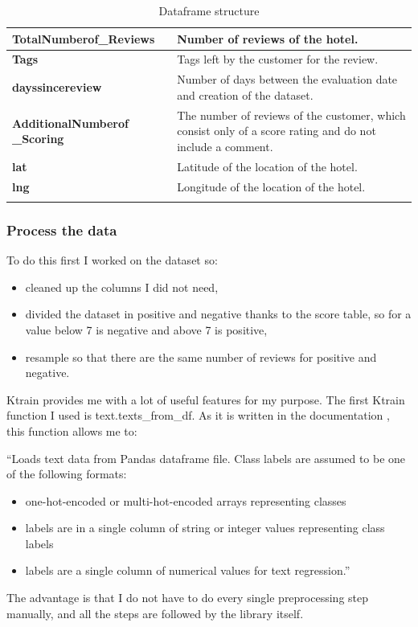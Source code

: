 \begin{longtable}[ c ]{| m{5cm} | m{8cm}|}
\textbf{TotalNumberof\_Reviews}               & Number of reviews of the hotel.                                                                   \\ \hline
\textbf{Tags}                                 & Tags left by the customer for the review.                                                 \\ \hline
\textbf{dayssincereview}                      & Number of days between the evaluation date and creation of the \gls{dataset}.                              \\ \hline
\textbf{AdditionalNumberof \_Scoring} & The number of reviews of the customer, which consist only of a score rating and do not include a comment. \\ \hline
\textbf{lat}                                  & Latitude of the location of the hotel.                                                                 \\ \hline
\textbf{lng}                                  & Longitude of the location of the hotel.                                                                  \\ \hline
\caption{Dataframe structure}
\label{tab:Dataframe structure}\\
\end{longtable}

\subsubsection{Process the data}
To do this first I worked on the dataset so:
\begin{itemize}
    \item cleaned up the columns I did not need,
    \item divided the dataset in positive and negative thanks to the score table, so for a value below 7 is negative and above 7 is positive,
    \item resample so that there are the same number of reviews for positive and negative.
\end{itemize}

\gls{Ktrain} provides me with a lot of useful features for my purpose.
The first \gls{Ktrain} function I used is text.texts\_from\_df.
As it is written in the documentation \cite{noauthor_amaiyaktrain_nodate}, this function allows me to:

“Loads text data from \gls{Pandas} dataframe file. Class labels are assumed to be one of the following formats:
\begin{itemize}
    \item one-hot-encoded or multi-hot-encoded arrays representing classes
    \item labels are in a single column of string or integer values representing class labels
    \item labels are a single column of numerical values for text regression.”
\end{itemize}
The advantage is that I do not have to do every single preprocessing step manually, and all the steps are followed by the library itself.

